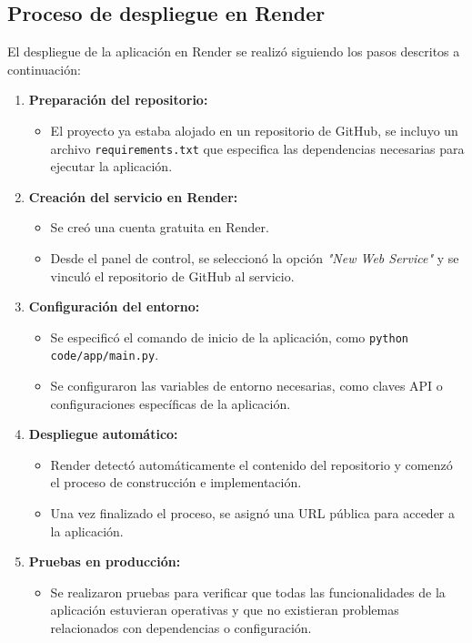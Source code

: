 \subsection{Proceso de despliegue en Render}

El despliegue de la aplicación en Render se realizó siguiendo los pasos descritos a continuación:

\begin{enumerate}
    \item \textbf{Preparación del repositorio:}
    \begin{itemize}
        \item El proyecto ya estaba alojado en un repositorio de GitHub, se incluyo un archivo \texttt{requirements.txt} que especifica las dependencias necesarias para ejecutar la aplicación.
    \end{itemize}

    \item \textbf{Creación del servicio en Render:}
    \begin{itemize}
        \item Se creó una cuenta gratuita en Render.
        \item Desde el panel de control, se seleccionó la opción \textit{"New Web Service"} y se vinculó el repositorio de GitHub al servicio.
    \end{itemize}

    \item \textbf{Configuración del entorno:}
    \begin{itemize}
        \item Se especificó el comando de inicio de la aplicación, como \texttt{python code/app/main.py}.
        \item Se configuraron las variables de entorno necesarias, como claves API o configuraciones específicas de la aplicación.
    \end{itemize}

    \item \textbf{Despliegue automático:}
    \begin{itemize}
        \item Render detectó automáticamente el contenido del repositorio y comenzó el proceso de construcción e implementación.
        \item Una vez finalizado el proceso, se asignó una URL pública para acceder a la aplicación.
    \end{itemize}

    \item \textbf{Pruebas en producción:}
    \begin{itemize}
        \item Se realizaron pruebas para verificar que todas las funcionalidades de la aplicación estuvieran operativas y que no existieran problemas relacionados con dependencias o configuración.
    \end{itemize}
\end{enumerate}

